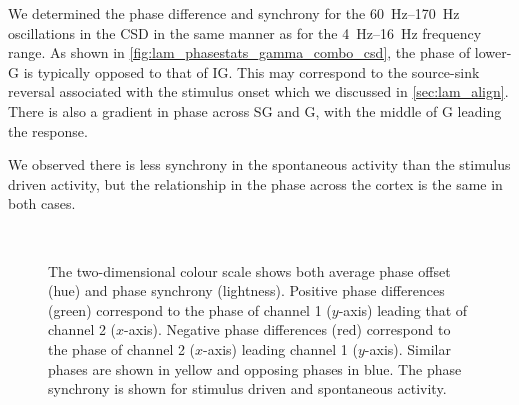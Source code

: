 

We determined the phase difference and synchrony for the \SIrange{60}{170}{Hz} oscillations in the \ac{CSD} in the same manner as for the \SIrange{4}{16}{Hz} frequency range.
As shown in \autoref{fig:lam_phasestats_gamma_combo_csd}, the phase of lower-\ac{G} is typically opposed to that of \ac{IG}.
This may correspond to the source-sink reversal associated with the stimulus onset which we discussed in \autoref{sec:lam_align}.
There is also a gradient in phase across \ac{SG} and \ac{G}, with the middle of \ac{G} leading the response.

We observed there is less synchrony in the spontaneous activity than the stimulus driven activity, but the relationship in the phase across the cortex is the same in both cases.

\begin{figure}[htbp]
    \centering
    \\
\caption{
The two-dimensional colour scale shows both average phase offset (hue) and phase synchrony (lightness).
Positive phase differences (green) correspond to the phase of channel 1 ($y$-axis) leading that of channel 2 ($x$-axis).
Negative phase differences (red) correspond to the phase of channel 2 ($x$-axis) leading channel 1 ($y$-axis).
Similar phases are shown in yellow and opposing phases in blue.
The phase synchrony is shown for stimulus driven \protect{} and spontaneous \protect{} activity.
}
\label{fig:lam_phasestats_gamma_combo_csd}
\end{figure}


